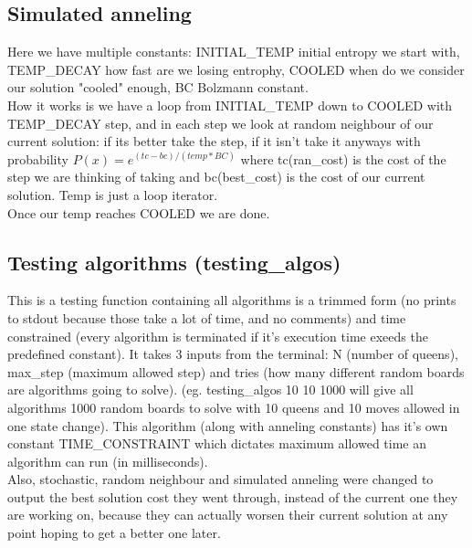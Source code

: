 \documentclass[10pt,a4paper]{article}
\begin{document}
		\subsection{Simulated anneling}
			Here we have multiple constants: INITIAL\_TEMP	initial entropy we start with, TEMP\_DECAY how fast are we losing entrophy, COOLED when do we consider our solution "cooled" enough, BC Bolzmann constant. \\
			How it works is we have a loop from INITIAL\_TEMP down to COOLED with TEMP\_DECAY step, and in each step we look at random neighbour of our current solution: if its better take the step, if it isn't take it anyways with probability $P(x)=e^{(tc-bc)/(temp*BC)}$ where tc(ran\_cost) is the cost of the step we are thinking of taking and bc(best\_cost) is the cost of our current solution. Temp is just a loop iterator.\\
			Once our temp reaches COOLED we are done.

		\subsection{Testing algorithms (testing\_algos)}
			This is a testing function containing all algorithms is a trimmed form (no prints to stdout because those take a lot of time, and no comments) and time constrained (every algorithm is terminated if it's execution time exeeds the predefined constant). It takes 3 inputs from the terminal: N (number of queens), max\_step (maximum allowed step) and tries (how many different random boards are algorithms going to solve). (eg. testing\_algos 10 10 1000 will give all algorithms 1000 random boards to solve with 10 queens and 10 moves allowed in one state change). This algorithm (along with anneling constants) has it's own constant TIME\_CONSTRAINT which dictates maximum allowed time an algorithm can run (in milliseconds).\\
			Also, stochastic, random neighbour and simulated anneling were changed to output the best solution cost they went through, instead of the current one they are working on, because they can actually worsen their current solution at any point hoping to get a better one later.
\end{document}
